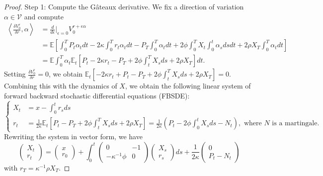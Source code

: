 \documentclass[openany,oneside]{article}
\theoremstyle{definition}
\theoremstyle{remark}
\newcommand{\E}{\mathbb{E}} %
\newcommand{\ts}{\textstyle}
\begin{document}
\begin{proof}
Step 1: Compute the G\^ateaux derivative. We fix a direction of variation $\alpha \in \mathcal{V}$ and compute
\begin{align*}
\ts\left\langle \frac{\delta V^r_0}{\delta r}, \alpha \right\rangle &\ts= \frac{d}{d\epsilon}\Big\vert_{\epsilon=0} V^{r+\epsilon\alpha}_0  \\
&\ts= \E\left[\int_0^T P_t \alpha_t dt - 2\kappa\int_0^T r_t \alpha_t dt - P_T \int_0^T \alpha_t dt + 2\phi\int_0^T X_t \int_0^t \alpha_s ds dt + 2\rho X_T \int_0^T \alpha_t dt \right] \\
&\ts= \E\int_0^T \alpha_t \E_t\left[P_t - 2\kappa r_t - P_T + 2\phi\int_t^T X_s ds + 2\rho X_T \right] dt.
\end{align*}
Setting $\frac{\delta V^r_0}{\delta r}=0$, we obtain $\E_t[-2\kappa r_t + P_t - P_T + 2\phi\int_t^T X_s ds + 2\rho X_T ] = 0$. Combining this with the dynamics of $X$, we obtain the following linear system of forward backward stochastic differential equations (FBSDE):
\[
\begin{cases}
X_t &= x-\int_0^t r_s ds \\
r_t &= \frac{1}{2\kappa}\E_t\left[P_t-P_T+2\phi\int_t^T X_s ds + 2\rho X_T\right] = \frac{1}{2\kappa}\left(P_t-2\phi\int_0^t X_s ds - N_t\right), \textrm{ where $N$ is a martingale.} 
\end{cases}
\]
Rewriting the system in vector form, we have
\[
\begin{pmatrix} X_t \\ r_t \end{pmatrix} = \begin{pmatrix} x \\ r_0 \end{pmatrix} + \int_0^t \begin{pmatrix} 0 & -1 \\ -\kappa^{-1}\phi & 0 \end{pmatrix} \begin{pmatrix} X_s \\ r_s \end{pmatrix} ds + \frac{1}{2\kappa}\begin{pmatrix} 0 \\ P_t - N_t \end{pmatrix}
\]
with $r_T = \kappa^{-1}\rho X_T$.


\end{proof}
\end{document}

